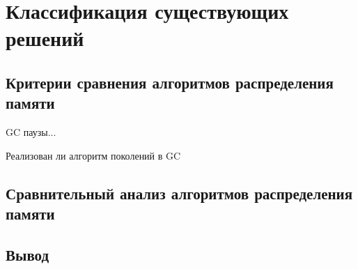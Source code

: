 \chapter{Классификация существующих решений}

\section{Критерии сравнения алгоритмов распределения памяти}
GC паузы...

Реализован ли алгоритм поколений в GC



\section{Сравнительный анализ алгоритмов распределения памяти}



\section{Вывод}
